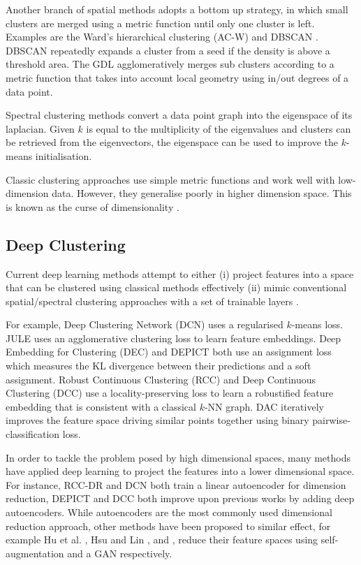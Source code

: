 \documentclass[letterpaper, 11pt]{IEEEtran}
\begin{document}
Another branch of spatial methods adopts a bottom up strategy, in which small clusters are merged using a metric function until only one cluster is left. Examples are the Ward's hierarchical clustering (AC-W) \cite{Murtagh2014} and DBSCAN \cite{Sander1998}. DBSCAN repeatedly expands a cluster from a seed if the density is above a threshold area. The GDL \cite{Zhang2012} agglomeratively merges sub clusters according to a metric function that takes into account local geometry using in/out degrees of a data point. 

Spectral clustering methods \cite{VonLuxburg2007,Nie2011,Shi} convert a data point graph into the eigenspace of its laplacian.
Given $k$ is equal to the multiplicity of the eigenvalues and clusters can be retrieved from the eigenvectors, the eigenspace can be used to improve the $k$-means initialisation. 

Classic clustering approaches use simple metric functions and work well with low-dimension data. However, they generalise poorly in higher dimension space. This is known as the curse of dimensionality \cite{Aggarwal2001,Domingos:2012:FUT:2347736.2347755,Bellman1962}. 

\subsection{Deep Clustering}\label{rel_deep}
Current deep learning methods attempt to either (i) project features into a space that can be clustered using classical methods effectively (ii) mimic conventional spatial/spectral clustering approaches with a set of trainable layers
\cite{DBLP:journals/corr/abs-1801-07648}.

For example, Deep Clustering Network (DCN) \cite{Yang2017} uses a regularised $k$-means loss. JULE \cite{Yang2016} uses an agglomerative clustering loss to learn feature embeddings.
Deep Embedding for Clustering (DEC) \cite{Xie2016} and DEPICT \cite{Dizaji2017} both use an assignment loss which measures the KL divergence between their predictions and a soft assignment.
Robust Continuous Clustering (RCC) \cite{Shah2018} and Deep Continuous Clustering (DCC) \cite{shah2018deep} use a locality-preserving loss to learn a robustified feature embedding that is consistent with a classical $k$-NN graph. 
DAC \cite{Chang2017} iteratively improves the feature space driving similar points together using binary pairwise-classification loss.


In order to tackle the problem posed by high dimensional spaces, many methods have applied deep learning to project the features into a lower dimensional space. 
For instance, 
RCC-DR \cite{Shah2018} and DCN both train a linear autoencoder for dimension reduction, 
DEPICT and DCC both improve upon previous works by adding deep autoencoders.
While autoencoders 
are the most commonly used dimensional reduction approach, other methods have been proposed to similar effect, for example Hu et al. \cite{Hu2017}, Hsu and Lin \cite{Hsu2018}, and \cite{VittalPremachandran2017}, reduce their feature spaces using self-augmentation and a GAN respectively.
\end{document}
